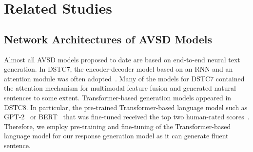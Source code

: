 \documentclass[letterpaper]{article} %
\begin{document}
\section{Related Studies}

\subsection{Network Architectures of AVSD Models}
Almost all AVSD models proposed to date are based on end-to-end neural text generation.
In DSTC7, the encoder-decoder model based on an RNN and an attention module was often adopted~\cite{Nguyen2018from,Hori2019end}.
% 
Many of the models for DSTC7 contained the attention mechanism for multimodal feature fusion and generated natural sentences to some extent.
Transformer-based generation models appeared in DSTC8.
In particular, the pre-trained Transformer-based language model such as GPT-2~\cite{Radford2019language} or BERT~\cite{Devlin2018bert} that was fine-tuned received the top two human-rated scores~\cite{Li2021bridging,Chen2020pretraining}.
Therefore, we employ pre-training and fine-tuning of the Transformer-based language model for our response generation model as it can generate fluent sentence.

\end{document}
